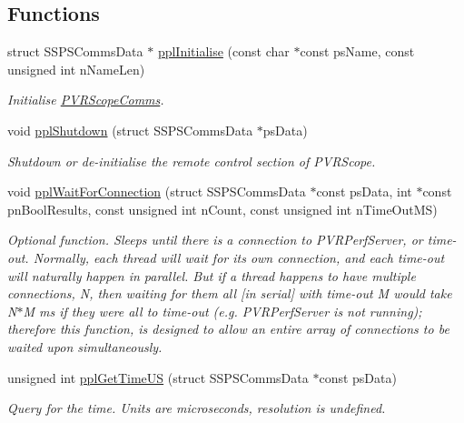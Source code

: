 \subsection*{Functions}
\begin{DoxyCompactItemize}
\item 
struct S\+S\+P\+S\+Comms\+Data $\ast$ \hyperlink{group___scope_comms_gac78024eaa66a39bc546e9a1b15529e3d}{ppl\+Initialise} (const char $\ast$const ps\+Name, const unsigned int n\+Name\+Len)
\begin{DoxyCompactList}\small\item\em Initialise \hyperlink{group___scope_comms}{P\+V\+R\+Scope\+Comms}. \end{DoxyCompactList}\item 
void \hyperlink{group___scope_comms_ga2365c21bdf4d60a59db79aaf7cc8645c}{ppl\+Shutdown} (struct S\+S\+P\+S\+Comms\+Data $\ast$ps\+Data)
\begin{DoxyCompactList}\small\item\em Shutdown or de-\/initialise the remote control section of P\+V\+R\+Scope. \end{DoxyCompactList}\item 
void \hyperlink{group___scope_comms_ga498873ebc2d0513afe3c141dd43a75c6}{ppl\+Wait\+For\+Connection} (struct S\+S\+P\+S\+Comms\+Data $\ast$const ps\+Data, int $\ast$const pn\+Bool\+Results, const unsigned int n\+Count, const unsigned int n\+Time\+Out\+M\+S)
\begin{DoxyCompactList}\small\item\em Optional function. Sleeps until there is a connection to P\+V\+R\+Perf\+Server, or time-\/out. Normally, each thread will wait for its own connection, and each time-\/out will naturally happen in parallel. But if a thread happens to have multiple connections, N, then waiting for them all \mbox{[}in serial\mbox{]} with time-\/out M would take N$\ast$\+M ms if they were all to time-\/out (e.\+g. P\+V\+R\+Perf\+Server is not running); therefore this function, is designed to allow an entire array of connections to be waited upon simultaneously. \end{DoxyCompactList}\item 
unsigned int \hyperlink{group___scope_comms_ga78bce8235bb537c2da3f26425b62930c}{ppl\+Get\+Time\+U\+S} (struct S\+S\+P\+S\+Comms\+Data $\ast$const ps\+Data)
\begin{DoxyCompactList}\small\item\em Query for the time. Units are microseconds, resolution is undefined. \end{DoxyCompactList}\item 

\end{DoxyCompactItemize}
